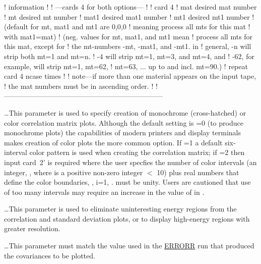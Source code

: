 \begin{ccode}
   !                    information
   !
   !   ---cards 4 for both options---
   !
   !  card 4
   !     mat            desired mat number
   !     mt             desired mt number
   !     mat1           desired mat1 number
   !     mt1            desired mt1 number
   !                    (default for mt, mat1 and mt1 are 0,0,0
   !                    meaning process all mts for this mat
   !                    with mat1=mat)
   !                    (neg. values for mt, mat1, and mt1 mean
   !                    process all mts for this mat, except for
   !                    the mt-numbers -mt, -mat1, and -mt1.  in
   !                    general, -n will strip both mt=1 and mt=n.
   !                    -4 will strip mt=1, mt=3, and mt=4, and
   !                    -62, for example, will strip mt=1, mt=62,
   !                    mt=63, ... up to and incl. mt=90.)
   !          repeat card 4 ncase times
   !
   ! note---if more than one material appears on the input tape,
   ! the mat numbers must be in ascending order.
   !
   !--------------------------------------------------------------------

\end{ccode}
\normalsize

 \ldots\hspace{0.1in}This parameter is used to specify
creation of monochrome (cross-hatched) or color correlation matrix
plots.  Although the default setting is =0 (to produce
monochrome plots) the capabilities of modern printers and display
terminals makes creation of color plots the more common
option.  If =1 a default six-interval color pattern is
used when creating the correlation matrix; if =2 then
input card~2' is required where the user specfies the number of
color intervals (an integer, , where  is a
positive non-zero integer $<$ 10) plus  real numbers
that define the color boundaries, , i=1,
.   must be unity.  Users
are cautioned that use of too many intervals may require an
increase in the value of  in .

 \ldots\hspace{.1in}This parameter is used to eliminate
uninteresting energy regions from the correlation and standard
deviation plots, or to display high-energy regions with greater
resolution.

 \ldots\hspace{.1in}This parameter must
match the value used in the \hyperlink{sERRORRhy}{ERRORR}
run that produced the covariances to be plotted.

